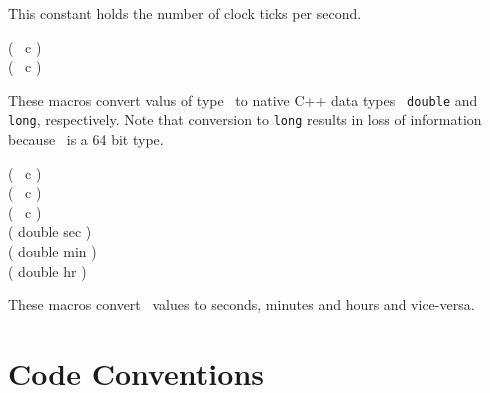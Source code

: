 This constant holds the number of clock ticks per second.

\begin{datatype}
\ClockToDouble( \CLOCK\ c ) \\
\ClockToLong( \CLOCK\ c ) \\
\end{datatype}

These macros convert valus of type \CLOCK\ to native C++ data types {\tt
  double} and {\tt long}, respectively. Note that conversion to {\tt long}
results in loss of information because \CLOCK\ is a 64 bit type.

\begin{datatype}
\ClockToSec( \CLOCK\ c ) \\
\ClockToMin( \CLOCK\ c ) \\
\ClockToHour( \CLOCK\ c ) \\
\SecToClock( double sec ) \\
\MinToClock( double min ) \\
\HourToClock( double hr ) \\
\end{datatype}

These macros convert \CLOCK\ values to seconds, minutes and hours and
vice-versa.

\section{Code Conventions}

